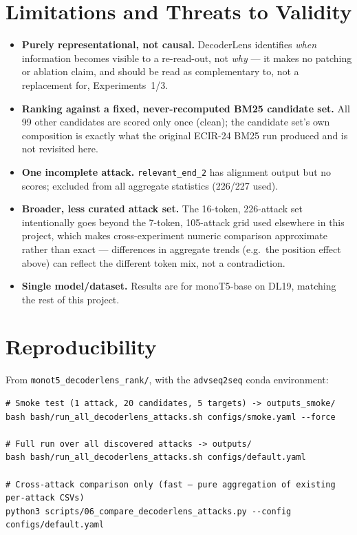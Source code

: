 \documentclass[11pt]{article}
\begin{document}
\section{Limitations and Threats to Validity}

\begin{itemize}
  \item \textbf{Purely representational, not causal.} DecoderLens
  identifies \emph{when} information becomes visible to a re-read-out, not
  \emph{why} — it makes no patching or ablation claim, and should be read
  as complementary to, not a replacement for, Experiments~1/3.
  \item \textbf{Ranking against a fixed, never-recomputed BM25 candidate
  set.} All 99 other candidates are scored only once (clean); the
  candidate set's own composition is exactly what the original ECIR-24
  BM25 run produced and is not revisited here.
  \item \textbf{One incomplete attack.} \texttt{relevant\_end\_2} has
  alignment output but no scores; excluded from all aggregate statistics
  (226/227 used).
  \item \textbf{Broader, less curated attack set.} The 16-token, 226-attack
  set intentionally goes beyond the 7-token, 105-attack grid used
  elsewhere in this project, which makes cross-experiment numeric
  comparison approximate rather than exact — differences in aggregate
  trends (e.g.\ the position effect above) can reflect the different token
  mix, not a contradiction.
  \item \textbf{Single model/dataset.} Results are for monoT5-base on
  DL19, matching the rest of this project.
\end{itemize}

\section{Reproducibility}

From \texttt{monot5\_decoderlens\_rank/}, with the \texttt{advseq2seq}
conda environment:

\begin{lstlisting}
# Smoke test (1 attack, 20 candidates, 5 targets) -> outputs_smoke/
bash bash/run_all_decoderlens_attacks.sh configs/smoke.yaml --force

# Full run over all discovered attacks -> outputs/
bash bash/run_all_decoderlens_attacks.sh configs/default.yaml

# Cross-attack comparison only (fast — pure aggregation of existing per-attack CSVs)
python3 scripts/06_compare_decoderlens_attacks.py --config configs/default.yaml
\end{lstlisting}
\end{document}
